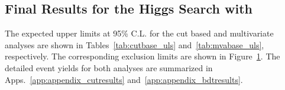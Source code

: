 \clearpage
\subsection{Final Results for the Higgs Search with \intlumiEightTeV{}}
\label{sec:search_results}

The expected 
upper limits at 95\% C.L. for the cut based and
multivariate analyses are shown in Tables~\ref{tab:cutbase_uls}
and~\ref{tab:mvabase_uls}, respectively. The corresponding exclusion
limits are shown in Figure~\ref{fig:uls}. The detailed event yields 
for both analyses are summarized in Apps.~\ref{app:appendix_cutresults} 
and~\ref{app:appendix_bdtresults}.

\begin{figure}[!hbtp]
\centering
{}
\centering
{}
\label{fig:uls}
\end{figure}

